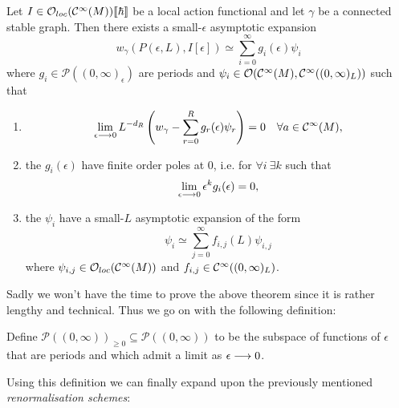 \begin{theo}
  Let $I \in \mathcal{O}_{loc}(\mathcal{C}^{\infty}(M))\llbracket \hbar \rrbracket$ be a local action functional and let $\gamma$ be a connected stable graph. Then there exists a small-$\epsilon$ asymptotic expansion
  \begin{equation}w_\gamma (P(\epsilon,L), I[\epsilon]) \simeq \sum_{i=0}^{\infty} g_i(\epsilon) \psi_i\end{equation}
  where $g_i \in \mathcal{P}((0,\infty)_\epsilon)$ are periods and $\psi_i \in \mathcal{O}(\mathcal{C}^{\infty}(M), \mathcal{C}^{\infty}((0,\infty)_L))$ such that
  \begin{enumerate}
    \item \begin{equation}
      \lim_{\epsilon\lra 0} L^{-d_R} \left(w_\gamma - \sum_{r=0}^R g_r(\epsilon) \psi_r \right) = 0 \quad \forall a \in \Ci(M),
    \end{equation}

    \item the $g_i(\epsilon)$ have finite order poles at $0$, i.e. for $\forall i \ \exists k$ such that
    \begin{equation}
      \lim_{\epsilon\lra 0} \epsilon^k g_i(\epsilon) = 0,
    \end{equation}

    \item the $\psi_i$ have a small-$L$ asymptotic expansion of the form
    \begin{equation}
      \psi_i \simeq \sum_{j=0}^{\infty} f_{i,j} (L) \psi_{i,j}
    \end{equation}
    where $\psi_{i,j} \in \mathcal{O}_{loc}(\mathcal{C}^{\infty}(M))$ and $f_{i,j} \in \mathcal{C}^{\infty}((0,\infty)_L)$.
  \end{enumerate}
\end{theo}

Sadly we won't have the time to prove the above theorem since it is rather lengthy and technical. Thus we go on with the following definition:

\begin{definition}
  Define $\mathcal{P}((0,\infty))_{\geq 0} \subseteq \mathcal{P}((0,\infty))$ to be the subspace of functions of $\epsilon$ that are periods and which admit a limit as $\epsilon \lra 0$.
\end{definition}

Using this definition we can finally expand upon the previously mentioned \emph{renormalisation schemes}:

